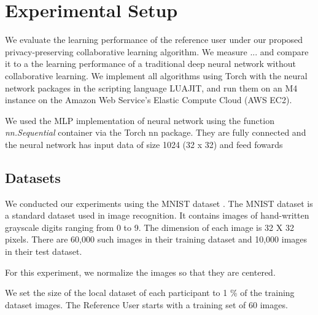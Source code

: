 \documentclass[conference]{IEEEtran}
\begin{document}
\section{Experimental Setup}

We evaluate the learning performance of the reference user under our proposed privacy-preserving collaborative learning algorithm. We
measure ... and compare it to a the learning performance of a traditional deep neural network without collaborative learning. 
We implement all algorithms using Torch with the neural network packages in the scripting language LUAJIT, and run them 
on an M4 instance on the Amazon Web Service's Elastic Compute Cloud (AWS EC2).

We used the MLP implementation of neural network using the function \textit{nn.Sequential} container via the Torch nn package. They are
fully connected and the neural network has input data of size 1024 (32 x 32) and feed fowards

\subsection{Datasets}
We conducted our experiments using the MNIST dataset \cite{deng2012mnist}. The MNIST dataset is a standard dataset used in image
recognition.
It contains images of hand-written grayscale digits ranging from 0 to 9. The dimension of each image is 32 X 32 pixels. There
are 60,000 such images in their training dataset and 10,000 images in their test dataset.

For this experiment, we normalize the images so that they are centered. 

We set the size of the local dataset of each participant to 1 \% of the training dataset images. 
The Reference User starts with a training set of 60 images.



\end{document}
